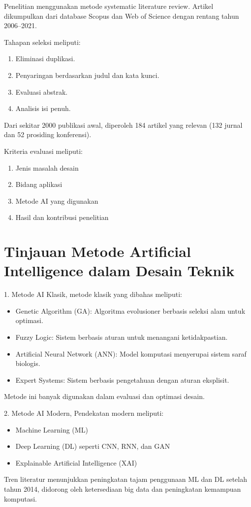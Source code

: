 \documentclass{article}
\begin{document}
Penelitian menggunakan metode systematic literature review. Artikel dikumpulkan dari database Scopus dan Web of Science dengan rentang tahun 2006–2021.

Tahapan seleksi meliputi: \begin{enumerate}
\item Eliminasi duplikasi.
\item Penyaringan berdasarkan judul dan kata kunci.
\item Evaluasi abstrak.
\item Analisis isi penuh.
\end{enumerate}

Dari sekitar 2000 publikasi awal, diperoleh 184 artikel yang relevan (132 jurnal dan 52 prosiding konferensi).

Kriteria evaluasi meliputi:\begin{enumerate}
\item Jenis masalah desain
\item Bidang aplikasi
\item Metode AI yang digunakan
\item Hasil dan kontribusi penelitian
\end{enumerate}

\section*{Tinjauan Metode Artificial Intelligence dalam Desain Teknik}

1. Metode AI Klasik,
metode klasik yang dibahas meliputi:\cite{minh2022explainable} \begin{itemize}
\item Genetic Algorithm (GA): Algoritma evolusioner berbasis seleksi alam untuk optimasi.
\item Fuzzy Logic: Sistem berbasis aturan untuk menangani ketidakpastian.
\item Artificial Neural Network (ANN): Model komputasi menyerupai sistem saraf biologis.
\item Expert Systems: Sistem berbasis pengetahuan dengan aturan eksplisit.
\end{itemize}
Metode ini banyak digunakan dalam evaluasi dan optimasi desain.

2. Metode AI Modern,
Pendekatan modern meliputi: \cite{alpaydin2014machine}  \begin{itemize}
\item Machine Learning (ML)
\item Deep Learning (DL) seperti CNN, RNN, dan GAN
\item Explainable Artificial Intelligence (XAI)
\end{itemize}
Tren literatur menunjukkan peningkatan tajam penggunaan ML dan DL setelah tahun 2014, didorong oleh ketersediaan big data dan peningkatan kemampuan komputasi.
\end{document}
